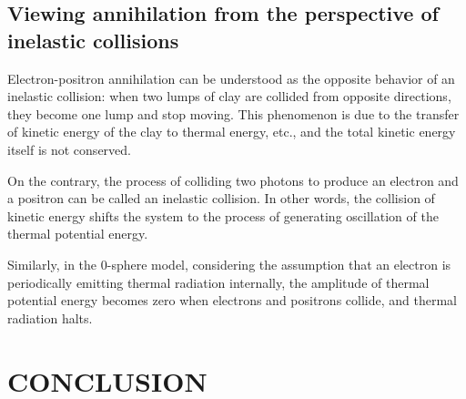 \documentclass[%
 reprint,
 amsmath,amssymb,
 aps,
]{revtex4-1}
\numberwithin{equation}{section}%
\begin{document}
\subsection{Viewing annihilation from the perspective of inelastic collisions}
\label{Viewing annihilation from the perspective of inelastic collisions}


Electron-positron annihilation can be understood as the opposite behavior of an inelastic collision: when two lumps of clay are collided from opposite directions, they become one lump and stop moving. This phenomenon is due to the transfer of kinetic energy of the clay to thermal energy, etc., and the total kinetic energy itself is not conserved.


On the contrary, the process of colliding two photons to produce an electron and a positron can be called an inelastic collision. In other words, the collision of kinetic energy shifts the system to the process of generating oscillation of the thermal potential energy.


Similarly, in the 0-sphere model, considering the assumption that an electron is periodically emitting thermal radiation internally, the amplitude of thermal potential energy becomes zero when electrons and positrons collide, and thermal radiation halts.








\section{\label{sec:CONCLUSION}CONCLUSION}
\end{document}
